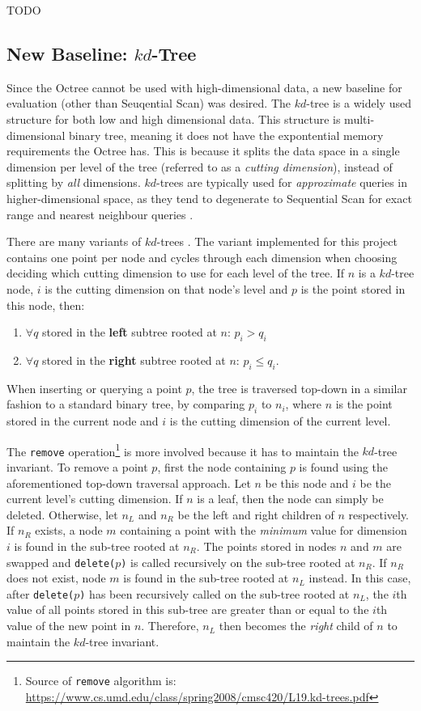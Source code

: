 TODO

\subsection{New Baseline: $kd$-Tree}

Since the Octree cannot be used with high-dimensional data, a new baseline for evaluation (other than Seuqential Scan) was desired. The $kd$-tree is a widely used structure for both low and high dimensional data. This structure is multi-dimensional binary tree, meaning it does not have the expontential memory requirements the Octree has. This is because it splits the data space in a single dimension per level of the tree (referred to as a \textit{cutting dimension}), instead of splitting by \textit{all} dimensions. $kd$-trees are typically used for \textit{approximate} queries in higher-dimensional space, as they tend to degenerate to Sequential Scan for exact range and nearest neighbour queries \cite{similarity-searching}.

There are many variants of $kd$-trees \cite{kd-tree, bkd-tree, kdb-tree}. The variant implemented for this project contains one point per node and cycles through each dimension when choosing deciding which cutting dimension to use for each level of the tree. If $n$ is a $kd$-tree node, $i$ is the cutting dimension on that node's level and $p$ is the point stored in this node, then:
\begin{enumerate}
	\item $\forall q$ stored in the \textbf{left} subtree rooted at $n$: $p_i > q_i$ 
	\item $\forall q$ stored in the \textbf{right} subtree rooted at $n$: $p_i \leq q_i$.
\end{enumerate}
When inserting or querying a point $p$, the tree is traversed top-down in a similar fashion to a standard binary tree, by comparing $p_i$ to $n_i$, where $n$ is the point stored in the current node and $i$ is the cutting dimension of the current level.

The \texttt{remove} operation\footnote{Source of \texttt{remove} algorithm is: \url{https://www.cs.umd.edu/class/spring2008/cmsc420/L19.kd-trees.pdf‎}} is more involved because it has to maintain the $kd$-tree invariant. To remove a point $p$, first the node containing $p$ is found using the aforementioned top-down traversal approach. Let $n$ be this node and $i$ be the current level's cutting dimension. If $n$ is a leaf, then the node can simply be deleted. Otherwise, let $n_L$ and $n_R$ be the left and right children of $n$ respectively. If $n_R$ exists, a node $m$ containing a point with the \textit{minimum} value for dimension $i$ is found in the sub-tree rooted at $n_R$. The points stored in nodes $n$ and $m$ are swapped and \texttt{delete($p$)} is called recursively on the sub-tree rooted at $n_R$. If $n_R$ does not exist, node $m$ is found in the sub-tree rooted at $n_L$ instead. In this case, after \texttt{delete($p$)} has been recursively called on the sub-tree rooted at $n_L$, the $i$th value of all points stored in this sub-tree are greater than or equal to the $i$th value of the new point in $n$. Therefore, $n_L$ then becomes the \textit{right} child of $n$ to maintain the $kd$-tree invariant.

